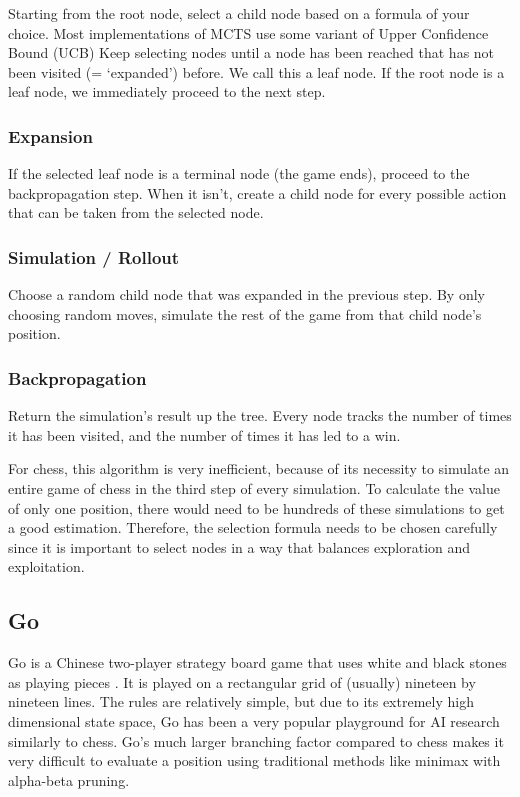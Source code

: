 \documentclass{article}
\begin{document}
Starting from the root node, select a child node based on a formula of your choice.
Most implementations of MCTS use some variant of Upper Confidence Bound (UCB) \cite{MLMonteCarlo2019}
Keep selecting nodes until a node has been reached that has not been visited (= `expanded') before. We call this a leaf node.
If the root node is a leaf node, we immediately proceed to the next step.


\subsubsection{Expansion}

If the selected leaf node is a terminal node (the game ends), proceed to the backpropagation step.
When it isn't, create a child node for every possible action that can be taken from the selected node.


\subsubsection{Simulation / Rollout}

Choose a random child node that was expanded in the previous step.
By only choosing random moves, simulate the rest of the game from that child node's position.

\subsubsection{Backpropagation}

Return the simulation's result up the tree.
Every node tracks the number of times it has been visited, and the number of times it has led to a win.

For chess, this algorithm is very inefficient, because of its necessity to simulate 
an entire game of chess in the third step of every simulation. 
To calculate the value of only one position, there would need to be hundreds of these simulations to get a good estimation.
Therefore, the selection formula needs to be chosen carefully since it is important to select nodes in a way that
balances exploration and exploitation.

\subsection{Go}

Go is a Chinese two-player strategy board game that uses white and black stones as playing pieces \cite{GoGame2022}.
It is played on a rectangular grid of (usually) nineteen by nineteen lines. The rules are relatively simple, but due to 
its extremely high dimensional state space, Go has been a very popular playground for AI research similarly to chess.
Go's much larger branching factor compared to chess makes it very difficult to evaluate a position using 
traditional methods like minimax with alpha-beta pruning.
\end{document}
